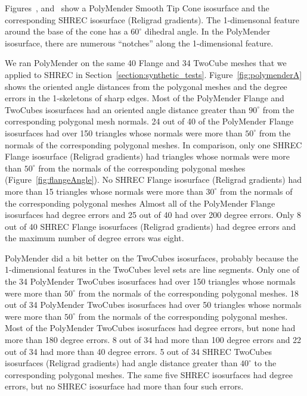 Figures~, 
and~
show a PolyMender Smooth Tip Cone isosurface and 
the corresponding SHREC isosurface (Religrad gradients).
The 1-dimensonal feature around the base of the cone has a $60^\circ$ dihedral angle.
In the PolyMender isosurface,
there are numerous ``notches'' along the 1-dimensional feature.

We ran PolyMender on the same 40 Flange and 34 TwoCube meshes
that we applied to SHREC in Section~\ref{section:synthetic_tests}.
Figure~\ref{fig:polymenderA} shows the oriented angle distances from the polygonal meshes
and the degree errors in the 1-skeletons of sharp edges.
Most of the PolyMender Flange and TwoCubes isosurfaces had an oriented angle distance greater than $90^\circ$
from the corresponding polygonal mesh normals.
24 out of 40 of the PolyMender Flange isosurfaces had over 150 triangles
whose normals were more than $50^\circ$ from the normals of the corresponding polygonal meshes.
In comparison, only one SHREC Flange isosurface (Religrad gradients) had triangles
whose normals were more than $50^\circ$ from the normals of the corresponding polygonal meshes
(Figure~\ref{fig:flangeAngle}).
No SHREC Flange isosurface (Religrad gradients) had more than 15 triangles
whose normals were more than $30^\circ$ from the normals of the corresponding polygonal meshes
Almost all of the PolyMender Flange isosurfaces had degree errors
and 25 out of 40 had over 200 degree errors.
Only 8 out of 40 SHREC Flange isosurfaces (Religrad gradients) had degree errors
and the maximum number of degree errors was eight.

PolyMender did a bit better on the TwoCubes isosurfaces,
probably because the 1-dimensional features in the TwoCubes level sets are line segments.
Only one of the 34 PolyMender TwoCubes isosurfaces had over 150 triangles
whose normals were more than $50^\circ$ from the normals of the corresponding polygonal meshes.
18 out of 34 PolyMender TwoCubes isosurfaces had over 50 triangles
whose normals were more than $50^\circ$ from the normals of the corresponding polygonal meshes.
Most of the PolyMender TwoCubes isosurfaces had degree errors,
but none had more than 180 degree errors.
8 out of 34 had more than 100 degree errors
and 22 out of 34 had more than 40 degree errors.
5 out of 34 SHREC TwoCubes isosurfaces (Religrad gradients)
had angle distance greater than $40^\circ$ to the corresponding polygonal meshes.
The same five SHREC isosurfaces had degree errors,
but no SHREC isosurface had more than four such errors.


